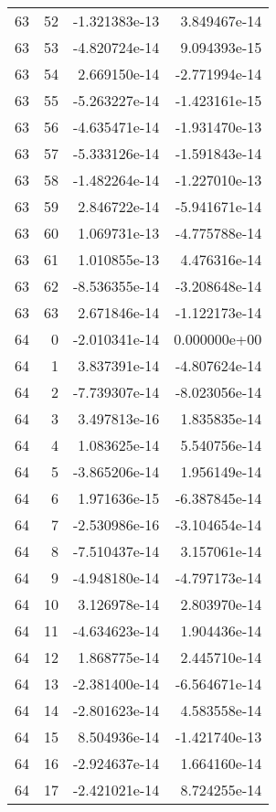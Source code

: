 \begin{tabular}{rrrr}
  63 &   52 & -1.321383e-13 &  3.849467e-14 \\
  63 &   53 & -4.820724e-14 &  9.094393e-15 \\
  63 &   54 &  2.669150e-14 & -2.771994e-14 \\
  63 &   55 & -5.263227e-14 & -1.423161e-15 \\
  63 &   56 & -4.635471e-14 & -1.931470e-13 \\
  63 &   57 & -5.333126e-14 & -1.591843e-14 \\
  63 &   58 & -1.482264e-14 & -1.227010e-13 \\
  63 &   59 &  2.846722e-14 & -5.941671e-14 \\
  63 &   60 &  1.069731e-13 & -4.775788e-14 \\
  63 &   61 &  1.010855e-13 &  4.476316e-14 \\
  63 &   62 & -8.536355e-14 & -3.208648e-14 \\
  63 &   63 &  2.671846e-14 & -1.122173e-14 \\
  64 &    0 & -2.010341e-14 &  0.000000e+00 \\
  64 &    1 &  3.837391e-14 & -4.807624e-14 \\
  64 &    2 & -7.739307e-14 & -8.023056e-14 \\
  64 &    3 &  3.497813e-16 &  1.835835e-14 \\
  64 &    4 &  1.083625e-14 &  5.540756e-14 \\
  64 &    5 & -3.865206e-14 &  1.956149e-14 \\
  64 &    6 &  1.971636e-15 & -6.387845e-14 \\
  64 &    7 & -2.530986e-16 & -3.104654e-14 \\
  64 &    8 & -7.510437e-14 &  3.157061e-14 \\
  64 &    9 & -4.948180e-14 & -4.797173e-14 \\
  64 &   10 &  3.126978e-14 &  2.803970e-14 \\
  64 &   11 & -4.634623e-14 &  1.904436e-14 \\
  64 &   12 &  1.868775e-14 &  2.445710e-14 \\
  64 &   13 & -2.381400e-14 & -6.564671e-14 \\
  64 &   14 & -2.801623e-14 &  4.583558e-14 \\
  64 &   15 &  8.504936e-14 & -1.421740e-13 \\
  64 &   16 & -2.924637e-14 &  1.664160e-14 \\
  64 &   17 & -2.421021e-14 &  8.724255e-14 \\

\end{tabular}
